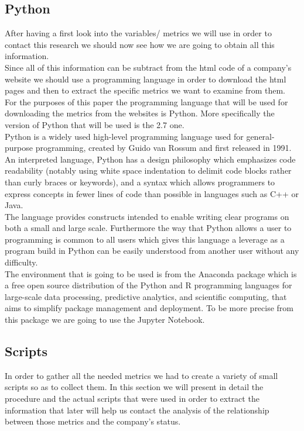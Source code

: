 \documentclass{article}
\begin{document}
\subsection{Python}
After having a first look into the variables/ metrics we will use in order to contact this research we should now see how we are going to obtain all this information.\\
Since all of this information can be subtract from the html code of a company's website we should use a programming language in order to download the html pages and then to extract the specific metrics we want to examine from them.\\
For the purposes of this paper the programming language that will be used for downloading the metrics from the websites is Python. More specifically the version of Python that will be used is the 2.7 one.\\
Python is a widely used high-level programming language used for general-purpose programming, created by Guido van Rossum and first released in 1991. An interpreted language, Python has a design philosophy which emphasizes code readability (notably using white space indentation to delimit code blocks rather than curly braces or keywords), and a syntax which allows programmers to express concepts in fewer lines of code than possible in languages such as C++ or Java. \\
The language provides constructs intended to enable writing clear programs on both a small and large scale. Furthermore the way that Python allows a user to programming is common to all users which gives this language a leverage as a program build in Python can be easily understood from another user without any difficulty.\\
The environment that is going to be used is from the Anaconda package which is a free open source distribution of the Python and R programming languages for large-scale data processing, predictive analytics, and scientific computing, that aims to simplify package management and deployment. To be more precise from this package we are going to use the Jupyter Notebook.\cite{key4} \\
\subsection{Scripts}
In order to gather all the needed metrics we had to create a variety of small scripts so as to collect them. In this section we will present in detail the procedure and the actual scripts that were used in order to extract the information that later will help us contact the analysis of the relationship between those metrics and the company's status.
\end{document}

